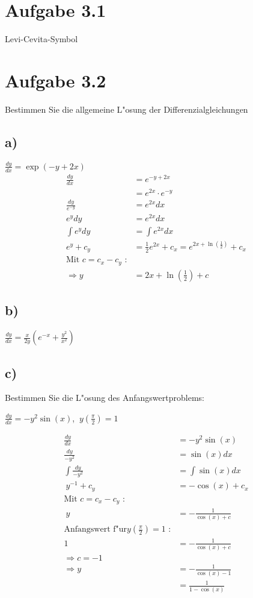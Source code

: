 \documentclass{theozettel}
\begin{document}

\section*{Aufgabe 3.1} Levi-Cevita-Symbol\\


\newpage
\section*{Aufgabe 3.2} Bestimmen Sie die allgemeine L"osung der Differenzialgleichungen\\
\subsection*{a)} $\frac{dy}{dx} = \exp\left(-y+2x\right)$\\
\begin{align*}
					\frac{dy}{dx} 	&= e^{-y+2x}\\
									&= e^{2x}\cdot e^{-y}\\
\frac{dy}{e^{-y}}	&= e^{2x} dx\\
e^y dy  &= e^{2x} dx\\
\int{e^y dy} &= \int{e^{2x} dx}\\
e^y +c_y &= \frac{1}{2} e^{2x} + c_x = e^{2x+ \ln\left(\frac{1}{2}\right)}+c_x\\
\text{Mit }c=c_x-c_y \text{ :}\\
\Rightarrow y&= 2x+ \ln{\left(\frac{1}{2}\right)}+c
\end{align*}
\subsection*{b)}$\frac{dy}{dx} = \frac{x}{2y}\left(e^{-x}+\frac{y^2}{x^2}\right)$\\
\subsection*{c)} Bestimmen Sie die L"osung des Anfangswertproblems:
\begin{center}
$\frac{dy}{dx} = -y^2 \sin\left(x\right)$,  $ \ y\left(\frac{\pi}{2}\right)=1$
\end{center}
\begin{align*}
\frac{dy}{dx} &= -y^2 \sin\left(x\right)\\
\frac{dy}{-y^2} &= \sin\left(x\right) dx\\
\int \frac{dy}{-y^2} &= \int \sin\left(x\right) dx\\
\ y^{-1} +c_y&= -\cos\left(x\right)+c_x\\
\text{Mit }c=c_x-c_y \text{ :}\\
\ y &= -\frac{1}{\cos\left(x\right)+c}\\
\text{Anfangswert f"ur}y\left(\frac{\pi}{2}\right)=1 \text{ :}\\
1&=-\frac{1}{\cos\left(x\right)+c}\\
\Rightarrow c=-1\\
\Rightarrow y&=-\frac{1}{\cos\left(x\right)-1}\\
&=\frac{1}{1-\cos\left(x\right)}
\end{align*}
\newpage
\end{document}
